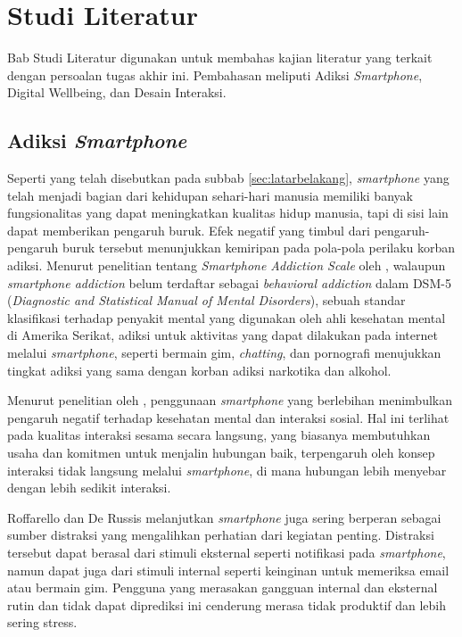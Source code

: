 \chapter{Studi Literatur}

Bab Studi Literatur digunakan untuk membahas kajian literatur yang terkait dengan persoalan tugas akhir ini. Pembahasan meliputi Adiksi \textit{Smartphone}, Digital Wellbeing, dan Desain Interaksi.

\section{Adiksi \textit{Smartphone}}
Seperti yang telah disebutkan pada subbab \ref{sec:latarbelakang}, \textit{smartphone} yang telah menjadi bagian dari kehidupan sehari-hari manusia memiliki banyak fungsionalitas yang dapat meningkatkan kualitas hidup manusia, tapi di sisi lain dapat memberikan pengaruh buruk. Efek negatif yang timbul dari pengaruh-pengaruh buruk tersebut menunjukkan kemiripan pada pola-pola perilaku korban adiksi. Menurut penelitian tentang \textit{Smartphone Addiction Scale} oleh \textcite{10.1371/journal.pone.0083558}, walaupun \textit{smartphone addiction} belum terdaftar sebagai \textit{behavioral addiction} dalam DSM-5 (\textit{Diagnostic and Statistical Manual of Mental Disorders}), sebuah standar klasifikasi terhadap penyakit mental yang digunakan oleh ahli kesehatan mental di Amerika Serikat, adiksi untuk aktivitas yang dapat dilakukan pada internet melalui \textit{smartphone}, seperti bermain gim, \textit{chatting}, dan pornografi menujukkan tingkat adiksi yang sama dengan korban adiksi narkotika dan alkohol.

Menurut penelitian oleh \textcite{Roffarello2019}, penggunaan \textit{smartphone} yang berlebihan menimbulkan pengaruh negatif terhadap kesehatan mental dan interaksi sosial. Hal ini terlihat pada kualitas interaksi sesama secara langsung, yang biasanya membutuhkan usaha dan komitmen untuk menjalin hubungan baik, terpengaruh oleh konsep interaksi tidak langsung melalui \textit{smartphone}, di mana hubungan lebih menyebar dengan lebih sedikit interaksi.

Roffarello dan De Russis melanjutkan \textit{smartphone} juga sering berperan sebagai sumber distraksi yang mengalihkan perhatian dari kegiatan penting. Distraksi tersebut dapat berasal dari stimuli eksternal seperti notifikasi pada \textit{smartphone}, namun dapat juga dari stimuli internal seperti keinginan untuk memeriksa email atau bermain gim. Pengguna yang merasakan gangguan internal dan eksternal rutin dan tidak dapat diprediksi ini cenderung merasa tidak produktif dan lebih sering stress.

